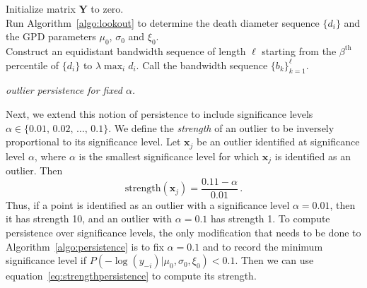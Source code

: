 \documentclass[letter,12pt]{article}
\begin{document}
\DontPrintSemicolon
\begin{algorithm}\fontsize{11}{12}\selectfont
    Initialize matrix $\bm{Y}$ to zero. \\	
	 Run Algorithm~\ref{algo:lookout} to determine the death diameter sequence $\{d_i\}$ and the GPD parameters $\mu_0$, $\sigma_0$ and $\xi_0$. \\
     Construct an equidistant bandwidth sequence of length $\ell$ starting from the $\beta^{\text{th}}$ percentile of $\{d_i\}$ to $ \lambda \max_i d_i$. Call the bandwidth sequence $\{b_k\}_{k=1}^{\ell}$. \\
	\caption{\itshape outlier persistence for fixed $\alpha$.}
	\label{algo:persistence}
\end{algorithm}


Next, we extend this notion of persistence to include significance levels $\alpha \in \{0.01, \, 0.02, \, \ldots, \, 0.1 \}$.
We define the \textit{strength} of an outlier to be inversely proportional to its significance level. Let $\bm{x}_j$ be an outlier identified at significance level $\alpha$, where $\alpha$ is the smallest significance level for which $\bm{x}_j$ is identified as an outlier. Then 
\begin{equation}\label{eq:strengthpersistence}
    \text{strength} \left( \bm{x}_j \right) = \frac{0.11 - \alpha}{0.01}  \, .
\end{equation}
Thus, if a point is identified as an outlier with a significance level  $ \alpha = 0.01$, then it has  strength  10, and  an outlier with $\alpha = 0.1$ has strength 1. To compute persistence over significance levels, the only modification that needs to be done to Algorithm~\ref{algo:persistence} is to fix $\alpha = 0.1$ and to record the minimum significance level   %
if $P\left(-\log(y_{-i})|\mu_0, \sigma_0, \xi_0 \right) < 0.1$. 
Then we can use equation~\eqref{eq:strengthpersistence} to compute its strength. 
\end{document}
